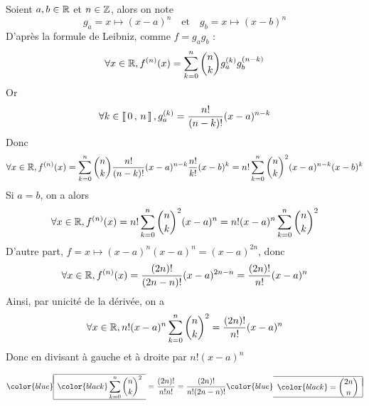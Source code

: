 \documentclass[mathmodern,openany,11pt]{livre}
\newcommand{\lboxed}[1]{{\color{blue}\begin{array}{|l}\hline\\[-2.4ex]{\color{black}#1}\\[1.2ex]\hline\end{array}}}
\newcommand{\rboxed}[1]{{\color{blue}\begin{array}{r|}\hline\\[-2.4ex]{\color{black}#1}\\[1.2ex]\hline\end{array}}}
\begin{document}
\begin{solution}
Soient $a,b\in\mathbb{R}$ et $n \in \mathbb{Z}$, alors on note 
\[
g_a = x\longmapsto (x-a)^n \quad\text{et}\quad g_b = x \longmapsto (x-b)^n
\]
D'après la formule de Leibniz, comme $f = g_a g_b$ :
\[
\forall x \in \mathbb{R},f^{(n)}(x) = \sum\limits_{k=0}^{n} \binom{n}{k} g_a^{(k)} g_b^{(n-k)}
\]
Or 
\[
\forall k \in \left\llbracket \, 0 \, , \, n \, \right\rrbracket, g_a^{(k)} = \dfrac{n!}{(n-k)!} (x-a)^{n-k}
\]
Donc 
\[
\forall x \in \mathbb{R},f^{(n)}(x) 
= \sum\limits_{k=0}^{n} \binom{n}{k}  \dfrac{n!}{(n-k)!} (x-a)^{n-k}  \dfrac{n!}{k!} (x-b)^{k}
= n! \sum\limits_{k=0}^{n} \binom{n}{k}^2  (x-a)^{n-k} (x-b)^{k}
\]
Si $a = b$, on a alors
\[
\forall x \in \mathbb{R},f^{(n)}(x) 
= n! \sum\limits_{k=0}^{n} \binom{n}{k}^2 (x-a)^{n}
=n!(x-a)^{n}\sum\limits_{k=0}^{n} \binom{n}{k}^2
\]
D'autre part, $f = x \longmapsto (x-a)^n (x-a)^n = (x-a)^{2n}$, donc 
\[
\forall x \in \mathbb{R},f^{(n)}(x) 
=  \dfrac{(2n)!}{(2n-n)!} (x-a)^{2n-n} =   \dfrac{(2n)!}{n!} (x-a)^{n}
\]
Ainsi, par unicité de la dérivée, on a 
\[
\forall x \in \mathbb{R},
n!(x-a)^{n}\sum\limits_{k=0}^{n} \binom{n}{k}^2 = \dfrac{(2n)!}{n!} (x-a)^{n}
\]
Donc en divisant à gauche et à droite par $n!(x-a)^{n}$

\[
\lboxed{\displaystyle\sum\limits_{k=0}^{n} \binom{n}{k}^2}
= \dfrac{(2n)!}{n!n!}
= \dfrac{(2n)!}{n!(2n-n)!} 
\rboxed{= \displaystyle\binom{2n}{n}}
\]
\end{solution}

\newpage
\pagestyle{default}
\end{document}
